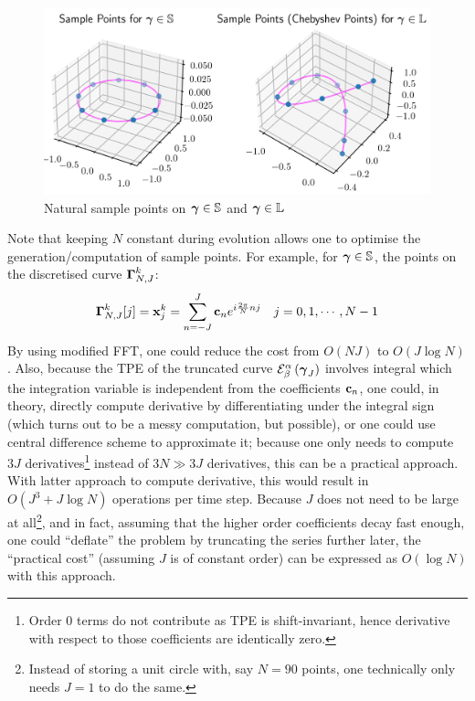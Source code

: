 \documentclass[../dissertation.tex]{subfiles}
\begin{document}
\begin{figure}[tbp]
    \centering
    \includegraphics[width=\textwidth]{sections/FourierSeriesImgs/SamplePointsOnCurves}
    \caption{Natural sample points on $\boldsymbol{\gamma} \in \mathbb{S}$ and $\boldsymbol{\gamma} \in \mathbb{L}$}
\end{figure}

Note that keeping $N$ constant during evolution allows one to optimise the generation/computation of sample points.
For example, for $\boldsymbol{\gamma} \in \mathbb{S}$, the points on the discretised curve $\boldsymbol{\Gamma}_{N,J}^k$:
\begin{align}
    \boldsymbol{\Gamma}_{N,J}^k [j] &= \mathbf{x}_{j}^{k} = \sum_{n=-J}^{J} \mathbf{c}_{n} e^{i \frac{2\pi}{N}n j} & j=0,1,\cdots,N-1
    \label{equ: DFT}
\end{align}
By using modified FFT\cite{5213896}, one could reduce the cost from $O\left( NJ \right)$ to $O \left( J \log N \right)$.
Also, because the TPE of the truncated curve $\mathcal{E}_{\beta}^{\alpha} \left( \boldsymbol{\gamma}_{J} \right)$ involves integral which the integration variable is independent from the coefficients $\mathbf{c}_n$,
one could, in theory, directly compute derivative by differentiating under the integral sign (which turns out to be a messy computation, but possible),
or one could use central difference scheme to approximate it;
because one only needs to compute $3J$ derivatives\footnote{Order $0$ terms do not contribute as TPE is shift-invariant, hence derivative with respect to those coefficients are identically zero.}
instead of $3N \gg 3J$ derivatives, this can be a practical approach.
With latter approach to compute derivative, this would result in $O\left( J^3 + J \log N \right)$ operations per time step.
Because $J$ does not need to be large at all\footnote{Instead of storing a unit circle with, say $N = 90$ points, one technically only needs $J=1$ to do the same.},
and in fact, assuming that the higher order coefficients decay fast enough,
one could ``deflate'' the problem by truncating the series further later,
the ``practical cost'' (assuming $J$ is of constant order) can be expressed as $O\left( \log N \right)$ with this approach.
\end{document}
